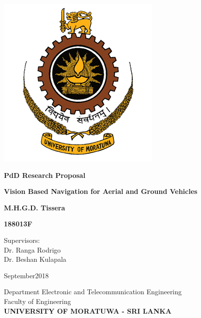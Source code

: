 \documentclass[a4paper,oneside,12pt]{report}
\begin{document}
	
\begin{titlepage}
	\begin{center}
		\includegraphics[scale=0.5]{uom}
		
		\vspace*{1cm}
		\Large
		\textbf{PdD Research Proposal}
		
		\vspace*{2cm}
		\Huge
		\textbf{Vision Based Navigation for Aerial and Ground Vehicles }
		
		\vspace{1cm}
		\large
		\textbf{M.H.G.D. Tissera}
		
		\vspace{1cm}
		\large
		\textbf{188013F}
		
		\vspace{1.5cm}
		\normalsize
		Supervisors:\\
		Dr. Ranga Rodrigo\\
		Dr. Beshan Kulapala
		
		\vfill
		September2018
		
		\vspace{0.8cm}
		\large
		Department Electronic and Telecommunication Engineering\\
		Faculty of Engineering\\
		\large
		\textbf{UNIVERSITY OF MORATUWA - SRI LANKA}
		
	\end{center}
\end{titlepage}


\setlength{\parskip}{1em}


\end{document}
